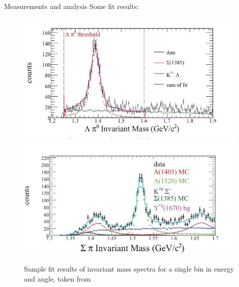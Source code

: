 \documentclass[11pt,aspectratio=1610,dvipsnames]{beamer}
\begin{document}
\begin{frame}{Measurements and analysis}
Some fit results:
\begin{figure}
	\centering
	\includegraphics[width=.49\linewidth]{inv_mass_res1.jpg}
	\includegraphics[width=.49\linewidth]{inv_mass_res2.jpg}
	\caption{ Sample fit results of invariant mass spectra for a single bin in energy and angle, taken from \citet{lineshapes}}
	
\end{figure}
\end{frame}
\end{document}
